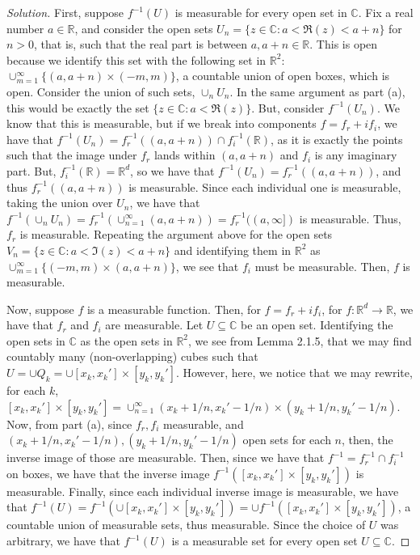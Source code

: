 \documentclass[10pt]{article}
\begin{document}
\begin{proof}[Solution]
First, suppose $f^{-1}(U)$ is measurable for every open set in $\mathbb{C}$. Fix a real number $a \in \mathbb{R}$, and consider the open sets $U_n = \{ z \in \mathbb{C} : a < \Re(z) < a+ n \}$ for $n > 0$, that is, such that the real part is between $a,a+n \in \mathbb{R}$. This is open because we identify this set with the following set in $\mathbb{R}^2$: $\cup_{m=1}^\infty \{ (a,a+n) \times (-m,m) \}$, a countable union of open boxes, which is open. Consider the union of such sets, $\cup_n U_n$. In the same argument as part (a), this would be exactly the set $ \{ z \in \mathbb{C} : a < \Re(z) \}$. But, consider $f^{-1}(U_n)$. We know that this is measurable, but if we break into components $f = f_r + i f_i$, we have that $f^{-1}(U_n) = f_r^{-1}((a,a+n)) \cap f_i^{-1}(\mathbb{R})$, as it is exactly the points such that the image under $f_r$ lands within $(a,a+n)$ and $f_i$ is any imaginary part. But, $f_i^{-1}(\mathbb{R}) = \mathbb{R}^d$, so we have that $f^{-1}(U_n) = f_r^{-1}((a,a+n))$, and thus $f_r^{-1}((a,a+n))$ is measurable. Since each individual one is measurable, taking the union over $U_n$, we have that $f^{-1}(\cup_n U_n) = f_r^{-1}(\cup_{n=1}^\infty(a,a+n))= f_r^{-1}((a,\infty])$ is measurable. Thus, $f_r$ is measurable. Repeating the argument above for the open sets $V_n = \{ z \in \mathbb{C} : a < \Im(z) < a+n \}$ and identifying them in $\mathbb{R}^2$ as  $\cup_{m=1}^\infty \{ (-m,m) \times (a,a+n) \}$, we see that $f_i$ must be measurable. Then, $f$ is measurable.

Now, suppose $f$ is a measurable function. Then, for $f = f_r + i f_i$, for $f: \mathbb{R}^d \to \mathbb{R}$, we have that $f_r$ and $f_i$ are measurable. Let $U \subseteq \mathbb{C}$ be an open set. Identifying the open sets in $\mathbb{C}$ as the open sets in $\mathbb{R}^2$, we see from Lemma 2.1.5, that we may find countably many (non-overlapping) cubes such that $U = \cup Q_k = \cup [x_k,x_k'] \times [y_k,y_k']$. However, here, we notice that we may rewrite, for each $k$, $ [x_k,x_k'] \times [y_k,y_k'] = \cup_{n=1}^\infty (x_k + 1/n,x_k' - 1/n) \times  (y_k + 1/n,y_k' - 1/n)$. Now, from part (a), since $f_r, f_i$ measurable, and $(x_k + 1/n,x_k' - 1/n), (y_k + 1/n,y_k' - 1/n)$ open sets for each $n$, then, the inverse image of those are measurable. Then, since we have that $f^{-1} = f_r^{-1} \cap f_i^{-1}$ on boxes, we have that the inverse image $f^{-1}([x_k,x_k'] \times [y_k,y_k'])$ is measurable. Finally, since each individual inverse image is measurable, we have that $f^{-1}(U) = f^{-1}( \cup [x_k,x_k'] \times [y_k,y_k']) = \cup f^{-1}( [x_k,x_k'] \times [y_k,y_k'])$, a countable union of measurable sets, thus measurable. Since the choice of $U$ was arbitrary, we have that  $f^{-1}(U)$ is a measurable set for every open set $U \subseteq \mathbb{C}$.

\end{proof}
\end{document}
